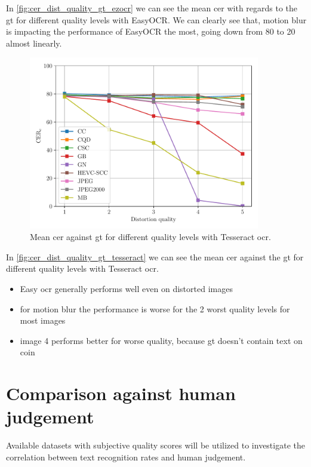 In \autoref{fig:cer_dist_quality_gt_ezocr} we can see the mean \gls{cer} with regards to the \gls{gt} for different quality levels with EasyOCR.
We can clearly see that, motion blur is impacting the performance of EasyOCR the most, going down from 80 to 20 almost linearly.

\begin{figure}[h]
\centering
    \includegraphics[width=0.9\textwidth]{../../images/analyze/cer_dist_quality_gt_tess.pdf}
    \caption{Mean \gls{cer} against \gls{gt} for different quality levels with Tesseract \gls{ocr}.}
\label{fig:cer_dist_quality_gt_tesseract}
\end{figure}

In \autoref{fig:cer_dist_quality_gt_tesseract} we can see the mean \gls{cer} against the \gls{gt} for different quality levels with Tesseract \gls{ocr}.

\begin{itemize}
\item Easy ocr generally performs well even on distorted images
\item for motion blur the performance is worse for the 2 worst quality levels for most images
\item image 4 performs better for worse quality, because \gls{gt} doesn't contain text on coin
\end{itemize}

\section{Comparison against human judgement}
\label{sec:comparison_against_human_judgement}

Available datasets with subjective quality scores will be utilized to investigate
the correlation between text recognition rates and human judgement.

